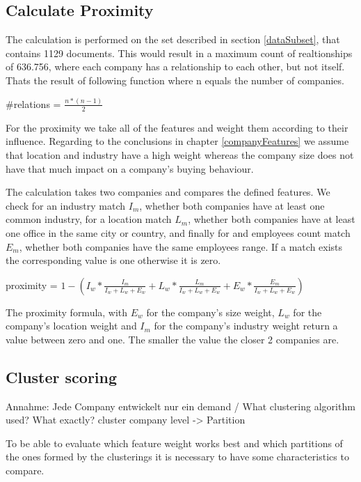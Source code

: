 \subsection{Calculate Proximity}
\label{companyProximity}
The calculation is performed on the set described in section \ref{dataSubset}, that contains 1129 documents. This would result in a maximum count of
realtionships of 636.756, where each company has a relationship to each other, but not itself. Thats the result of following
function where n equals the number of companies.

\begin{center}
  { \Large #relations \LARGE = $\frac{n*(n-1)}{2}$}
\end{center}

For the proximity we take all of the features and weight them according to their influence. Regarding to the conclusions in chapter
\ref{companyFeatures} we assume that location and industry have a high weight whereas the company size does not have that much impact
on a company's buying behaviour.

The calculation takes two companies and compares the defined features. We check for an industry match $I_m$, whether both companies have at least
one common industry, for a location match $L_m$, whether both companies have at least one office in the same city or country, and finally
for and employees count match $E_m$, whether both companies have the same employees range. If a match exists the corresponding
value is one otherwise it is zero.

\begin{center}
  \label{proximityFormula}
  {  proximity = $1 - ( I_w * \frac{I_m}{I_w + L_w + E_w} + L_w * \frac{L_m}{I_w + L_w + E_w} + E_w * \frac{E_m}{I_w + L_w + E_w})$}
\end{center}

The proximity formula, with $E_w$ for the company's size weight, $L_w$ for the company's location weight and $I_m$ for the company's
industry weight return a value between zero and one. The smaller the value the closer 2 companies are.

\subsection{Cluster scoring}
\label{clusterScoring}
Annahme: Jede Company entwickelt nur ein demand / What clustering algorithm used? What exactly? cluster company level -> Partition

To be able to evaluate which feature weight works best and which partitions of the ones formed by the
clusterings it is necessary to have some characteristics to compare.

